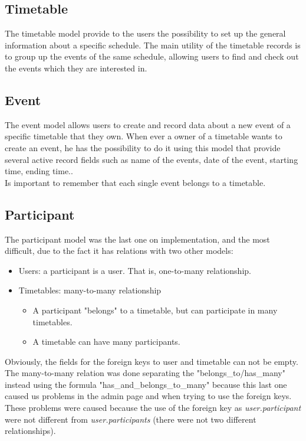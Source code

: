 \subsection{Timetable}
\vspace{-5mm}
The timetable model provide to the users the possibility to set up the general information about a specific schedule. The main utility of the timetable records is to group up the events of the same schedule, allowing users to find and check out the events which they are interested in.
\subsection{Event}
\vspace{-5mm}
The event model allows users to create and record data about a new event of a specific timetable that they own. When ever a owner of a timetable wants to create an event, he has the possibility to do it using this model that provide several active record fields such as name of the events, date of the event, starting time, ending time.. \\
Is important to remember that each single event belongs to a timetable.
\subsection{Participant}
\vspace{-5mm}
The participant model was the last one on implementation, and the most difficult, due to the fact it has relations with two other models:
\begin{itemize} \setlength{\itemsep}{-5pt}
\item Users: a participant is a user. That is, one-to-many relationship.
\item Timetables: many-to-many relationship
\begin{itemize} \setlength{\itemsep}{-5pt}
\item A participant "belongs" to a timetable, but can participate in many timetables.
\item A timetable can have many participants.
\end{itemize}
\end{itemize} 
Obviously, the fields for the foreign keys to user and timetable can not be empty.\\
The many-to-many relation was done separating the "belongs\_to/has\_many" instead using the formula "has\_and\_belongs\_to\_many" because this last one caused us problems in the admin page and when trying to use the foreign keys. These problems were caused  because the use of the foreign key as \textit{user.participant} were not different from \textit{user.participants} (there were not two different relationships).
